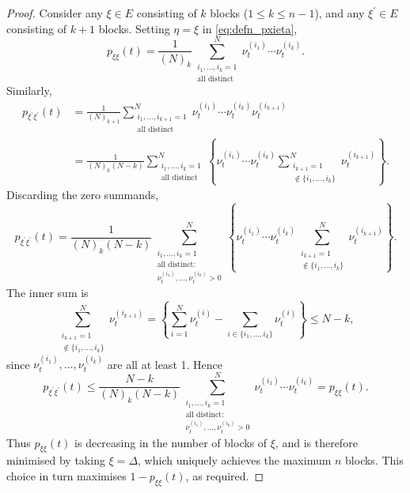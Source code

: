 \begin{proof}
Consider any $\xi \in E$ consisting of $k$ blocks ($1\leq k\leq n-1$), and any $\xi^\prime\in E$ consisting of $k+1$ blocks. 
Setting $\eta=\xi$ in \eqref{eq:defn_pxieta},
\begin{equation*}
p_{\xi\xi}(t) 
= \frac{1}{(N)_k} \sum_{\substack{i_1,\dots,i_k=1 \\ \text{all distinct}}}^N 
        \nu_t^{(i_1)} \cdots \nu_t^{(i_k)} .
\end{equation*}
Similarly,
\begin{align*}
p_{\xi^\prime\xi^\prime}(t) &= \frac{1}{(N)_{k+1}} 
        \sum_{\substack{i_1,\dots, i_{k+1} =1 \\ \text{all distinct}}}^N 
        \nu_t^{(i_1)} \cdots \nu_t^{(i_k)} \nu_t^{(i_{k+1})} \\
&= \frac{1}{(N)_k(N-k)} \sum_{\substack{i_1,\dots,i_k =1 \\ \text{all distinct}}}^N 
        \left\{ \nu_t^{(i_1)} \cdots \nu_t^{(i_k)} 
        \sum_{\substack{i_{k+1}=1 \\ \notin \{i_1,\ldots, i_k\} }}^N 
        \nu_t^{(i_{k+1})} \right\} .
\end{align*}
Discarding the zero summands,
\begin{equation*}
p_{\xi^\prime\xi^\prime}(t) 
    = \frac{1}{(N)_k(N-k)} \sum_{\substack{i_1,\dots,i_k =1 \\ \text{all distinct:} 
        \\ \nu_t^{(i_1)},\dots,\nu_t^{(i_k)} > 0 }}^N
        \left\{ \nu_t^{(i_1)} \cdots \nu_t^{(i_k)} 
        \sum_{\substack{i_{k+1}=1 \\ \notin \{i_1,\ldots, i_k\} }}^N 
        \nu_t^{(i_{k+1})} \right\} .
\end{equation*}
The inner sum is
\begin{equation*}
\sum_{\substack{i_{k+1}=1 \\ \notin \{i_1,\ldots, i_k\} }}^N \nu_t^{(i_{k+1})} 
    = \left\{ \sum_{i=1}^N \nu_t^{(i)} -  \sum_{i\in\{i_1,\dots,i_k\} } 
        \nu_t^{(i)} \right\}
    \leq N - k ,
\end{equation*}
since $\nu_t^{(i_1)},\dots,\nu_t^{(i_k)} $ are all at least 1.
Hence
\begin{equation*}
p_{\xi^\prime\xi^\prime}(t)
    \leq  \frac{N-k}{(N)_k(N-k)} \sum_{\substack{i_1,\dots,i_k =1 
        \\ \text{all distinct:} \\ \nu_t^{(i_1)},\dots,\nu_t^{(i_k)} > 0 }}^N 
        \nu_t^{(i_1)} \cdots \nu_t^{(i_k)} 
    = p_{\xi\xi}(t) .
\end{equation*}
Thus $p_{\xi\xi}(t)$ is decreasing in the number of blocks of $\xi$, and is therefore minimised by taking $\xi = \Delta$, which uniquely achieves the maximum $n$ blocks. This choice in turn maximises $1-p_{\xi\xi}(t)$, as required.
\end{proof}




